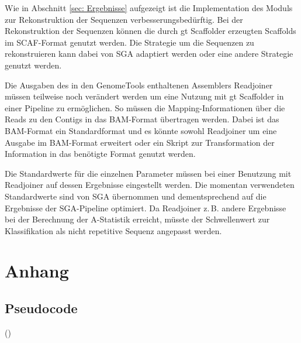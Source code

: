 \documentclass[a4paper,10pt,parskip]{scrartcl}
\begin{document}
Wie in Abschnitt \ref{sec: Ergebnisse} aufgezeigt ist die
Implementation des Moduls zur Rekonstruktion der Sequenzen
verbesserungsbedürftig. Bei der Rekonstruktion der Sequenzen können
die durch gt Scaffolder erzeugten Scaffolds im SCAF-Format genutzt
werden. Die Strategie um die Sequenzen zu rekonstruieren kann dabei
von SGA adaptiert werden oder eine andere Strategie genutzt werden.

Die Ausgaben des in den GenomeTools enthaltenen Assemblers Readjoiner
müssen teilweise noch verändert werden um eine Nutzung mit gt
Scaffolder in einer Pipeline zu ermöglichen. So müssen die
Mapping-Informationen über die Reads zu den Contigs in das BAM-Format
übertragen werden. Dabei ist das BAM-Format ein Standardformat und es
könnte sowohl Readjoiner um eine Ausgabe im BAM-Format erweitert oder
ein Skript zur Transformation der Information in das benötigte Format
genutzt werden.

Die Standardwerte für die einzelnen Parameter müssen bei einer
Benutzung mit Readjoiner auf dessen Ergebnisse eingestellt werden. Die
momentan verwendeten Standardwerte sind von SGA übernommen und
dementsprechend auf die Ergebnisse der SGA-Pipeline optimiert. Da
Readjoiner z.\,B. andere Ergebnisse bei der Berechnung der A-Statistik
erreicht, müsste der Schwellenwert zur Klassifikation als nicht
repetitive Sequenz angepasst werden.

\section*{Anhang}
\subsection*{Pseudocode}
()
\end{document}
